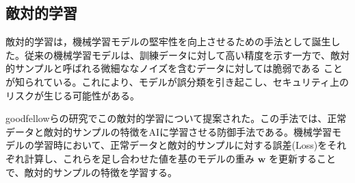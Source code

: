 
\subsection{敵対的学習}
敵対的学習は，機械学習モデルの堅牢性を向上させるための手法として誕生した。従来の機械学習モデルは、訓練データに対して高い精度を示す一方で、敵対的サンプルと呼ばれる微細ななノイズを含むデータに対しては脆弱である
ことが知られている。これにより、モデルが誤分類を引き起こし、セキュリティ上のリスクが生じる可能性がある。

goodfellowらの研究\cite{goodfellow2015explaining}でこの敵対的学習について提案された。この手法では、正常データと敵対的サンプルの特徴をAIに学習させる防御手法である。機械学習モデルの学習時において、正常データと敵対的サンプルに対する誤差(Loss)をそれぞれ計算し、これらを足し合わせた値を基のモデルの重み $\bm{w}$ を更新することで、敵対的サンプルの特徴を学習する。


